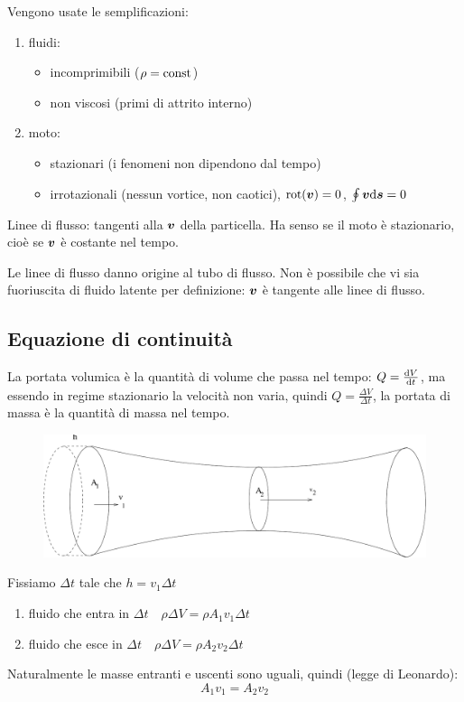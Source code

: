 \begin{minipage}[]{\textwidth}
Vengono usate le semplificazioni:
\begin{enumerate}
\item fluidi:
\begin{itemize}
\item incomprimibili ($\rho=\text{const}$)
\item non viscosi (primi di attrito interno)
\end{itemize}
\item moto:
\begin{itemize}
\item stazionari (i fenomeni non dipendono dal tempo)
\item irrotazionali (nessun vortice, non caotici), $\mathrm{rot}(\boldsymbol{v})=0$, $\oint \boldsymbol{v} \mathrm{d} \boldsymbol{s}=0$
\end{itemize}
\end{enumerate}
\end{minipage}
Linee di flusso: tangenti alla $\boldsymbol{v}$ della particella. Ha senso se il moto è stazionario, cioè se $\boldsymbol{v}$ è costante nel tempo.

Le linee di flusso danno origine al tubo di flusso. Non è possibile che vi sia fuoriuscita di fluido latente per definizione: $\boldsymbol{v}$ è tangente alle linee di flusso.

\subsection{Equazione di continuità}
La portata volumica è la quantità di volume che passa nel tempo: $Q=\frac{\mathrm{d} V}{\mathrm{d} t}$, ma essendo in regime stazionario la velocità non varia, quindi $Q=\frac{\Delta V}{\Delta t}$, la portata di massa è la quantità di massa nel tempo.


\begin{figure}[htbp]
\centering
\includegraphics[scale=0.4]{immagini/fisica1/equazione_continuita}
\end{figure}
Fissiamo $\Delta t$ tale che $h=v_1\Delta t$
\begin{enumerate}
\item fluido che entra in $\Delta t\quad \rho\Delta V=\rho A_1v_1\Delta t$
\item fluido che esce in $\Delta t\quad \rho\Delta V=\rho A_2v_2\Delta t$
\end{enumerate}
Naturalmente le masse entranti e uscenti sono uguali, quindi (legge di Leonardo):
$$A_1v_1=A_2v_2$$

